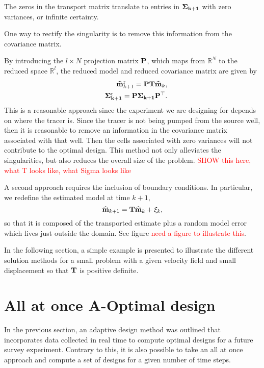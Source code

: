 \documentclass[12pt]{article}
\newcommand {\bfP}  { {\bf P} }
\newcommand{\alert}[1] {\textcolor{red}{#1}}
\newcommand{\bT}  {\text{\bf T}} %
\newcommand{\mhat}{\widehat{\bf m}}
\newcommand{\Sigh}{\bf \Sigma}
\begin{document}
The zeros in the transport matrix translate to entries in $\Sigh_{k+1}$ with zero variances, or infinite certainty. 


One way to rectify the singularity is to remove this information from the covariance matrix. 

By introducing the $l\times N$ projection matrix $\bfP$, which maps from  $\mathbb{R}^{N}$ to the reduced space $\mathbb{R}^{l}$,  the reduced model and reduced covariance matrix are given by
\begin{eqnarray}
&&\mhat^{\text{r}}_{k+1} =\bfP \bT \mhat_{k},\\
&&\Sigh^{\text{r}}_{k+1} = \bfP \Sigh_{k+1}\bfP^{\top}.
\end{eqnarray}
This is a reasonable approach since the experiment we are designing for depends on where the tracer is. Since the tracer is not being pumped from the source well, then it is reasonable to remove an information in the covariance matrix associated with that well. 
Then the cells associated with zero variances will not contribute to the optimal design. This method not only alleviates the singularities, but also reduces the overall size of the problem.  
\alert{SHOW this here, what T looks like, what Sigma looks like}

\bigskip
{}
A second approach requires the inclusion of boundary conditions. In particular, we redefine the estimated model at time $k+1$, 
\begin{equation}
\mhat_{k+1} = \bT \mhat_{k} + \xi_k,
\end{equation}
so that it is composed of the transported estimate plus a random model error which lives just outside the domain. See figure \alert{need a figure to illustrate this}.

In the following section, a simple example is presented to illustrate the different solution methods for a small problem with a given velocity field and small displacement so that $\bT$ is positive definite. 


\section{All at once A-Optimal design}
In the previous section, an adaptive design method was outlined that incorporates data collected in real time to compute optimal designs for a future survey experiment. Contrary to this, it is also possible to take an all at once approach and compute a set of designs for a given number of time steps. 
\end{document}
